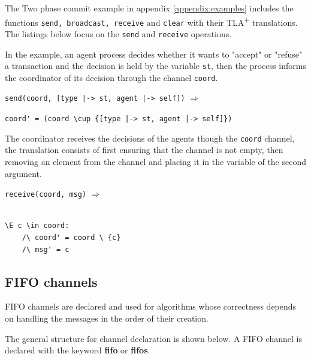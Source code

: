 \documentclass{thesul}
\newcommand{\tlaplus}{TLA\textsuperscript{+}\xspace}
\newcommand{\keyword}[1]{\textbf{#1}}
\begin{document}
The Two phase commit example in appendix \ref{appendix:examples} includes the functions \verb|send, broadcast, receive| and \verb|clear| with their \tlaplus translations. The listings below focus on the \verb|send| and \verb|receive| operations.

In the example, an agent process decides whether it wants to "accept" or "refuse" a transaction and the decision is held by the variable \verb|st|, then the process informs the coordinator of its decision through the channel \verb|coord|.

\begin{minipage}{.46\textwidth}

\lstinline!send(coord, [type |-> st, agent |-> self])! $\Rightarrow$
\end{minipage}
\begin{minipage}{.9\textwidth}
\lstinline!coord' = (coord \cup {[type |-> st, agent |-> self]})!
\end{minipage}\hfill\hfill

The coordinator receives the decisions of the agents though the \verb|coord| channel, the translation consists of first ensuring that the channel is not empty, then removing an element from the channel and placing it in the variable of the second argument. 

\begin{minipage}{.25\textwidth}

\lstinline!receive(coord, msg)! $\Rightarrow$\\\\
\end{minipage}
\begin{minipage}{.9\textwidth}
\begin{lstlisting}[frame = none, numbers = none]
\E c \in coord:
	/\ coord' = coord \ {c}
	/\ msg' = c
\end{lstlisting}

\end{minipage}\hfill


\subsection{FIFO channels}

FIFO channels are declared and used for algorithms whose correctness depends on handling the messages in the order of their creation.

The general structure for channel declaration is shown below. A FIFO channel is declared with the keyword \keyword{fifo} or \keyword{fifos}. 
\end{document}
